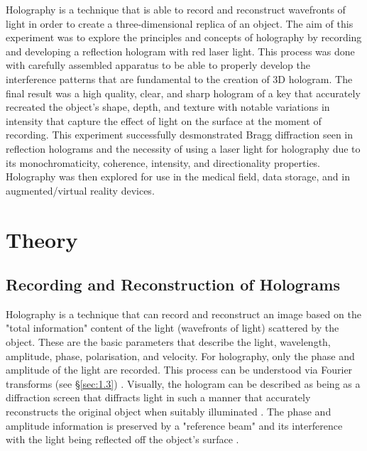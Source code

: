 \documentclass[12pt]{article}
\begin{document}
Holography is a technique that is able to record and reconstruct wavefronts of light in order to create a three-dimensional replica of an object. The aim of this experiment was to explore
the principles and concepts of holography by recording and developing a reflection hologram with red laser light. This process was done with carefully assembled apparatus to be able to properly develop the 
interference patterns that are fundamental to the creation of 3D hologram. The final result was a high quality, clear, and sharp hologram of a key that accurately recreated the object's shape, depth, and texture
with notable variations in intensity that capture the effect of light on the surface at the moment of recording. This experiment successfully desmonstrated Bragg diffraction seen in reflection holograms and
the necessity of using a laser light for holography due to its monochromaticity, coherence, intensity, and directionality properties. Holography was then explored for use in the medical field, data storage, and in
augmented/virtual reality devices.

\newpage


\setcounter{page}{1}
\section{Theory} \label{sec:1}

\subsection{Recording and Reconstruction of Holograms}

Holography is a technique that can record and reconstruct an image based on the "total information" content of the light (wavefronts of light) scattered by the object. These are the basic parameters that describe the light,
wavelength, amplitude, phase, polarisation, and velocity. For holography, only the phase and amplitude of the light are recorded. This process can be understood via Fourier transforms (see §\ref{sec:1.3})
\cite{UCDholo,basicholo1,princetonholo,collier2013optical}.
Visually, the hologram can be described as being as a diffraction screen that diffracts light in such a manner that accurately reconstructs the original object when suitably illuminated
\cite{basicholo1}.
The phase and amplitude information is preserved by a "reference beam" and its interference with the light being reflected off the object's surface
\cite{UCDholo,princetonholo}.
\end{document}
